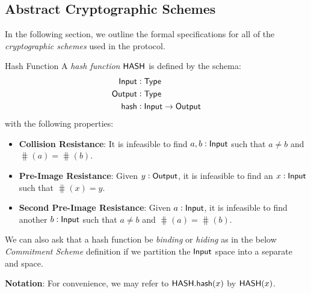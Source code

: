 
\subsection{Abstract Cryptographic Schemes}

In the following section, we outline the formal specifications for all of the \emph{cryptographic schemes} used in the \MantaPay{} protocol.

\begin{definitiontoc}{Hash Function}
    A \emph{hash function} ${\textsf{HASH}}$ is defined by the schema:
    \begin{align*}
        {\textsf{Input}}  &: {\textsf{Type}} \\
        {\textsf{Output}} &: {\textsf{Type}} \\
        {\textsf{hash}}   &: {\textsf{Input}} \to {\textsf{Output}}
    \end{align*}
    with the following properties:
    \begin{itemize}
        \item \textbf{Collision Resistance}: It is infeasible to find $a, b : {\textsf{Input}}$ such that $a \ne b$ and $\hash(a) = \hash(b)$.
        \item \textbf{Pre-Image Resistance}: Given $y : {\textsf{Output}}$, it is infeasible to find an $x : {\textsf{Input}}$ such that $\hash(x) = y$.
        \item \textbf{Second Pre-Image Resistance}: Given $a : {\textsf{Input}}$, it is infeasible to find another $b : {\textsf{Input}}$ such that $a \ne b$ and $\hash(a) = \hash(b)$.
    \end{itemize}

    We can also ask that a hash function be \emph{binding} or \emph{hiding} as in the below \emph{Commitment Scheme} definition if we partition the ${\textsf{Input}}$ space into a separate \Randomness{} and \Input{} space.

    \textbf{Notation}: For convenience, we may refer to ${\textsf{HASH}}.{\textsf{hash}}(x)$ by ${\textsf{HASH}}(x)$.
\end{definitiontoc}


